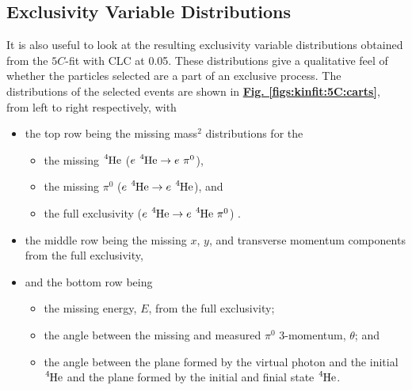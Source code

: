 \documentclass[10pt,prd,aps,showpacs,twocolumn,unsortedaddress]{revtex4-1}
\newcommand\he{{\ce{^{4}He}}}
\newcommand\pio{{\pi^0}}
\renewcommand\b[1]{{\textbf{#1}}}
\renewcommand\u[1]{{\underline{#1}}}
\newcommand\Fig[1]{\b{{\u{{Fig. #1}}}}}
\begin{document}
\subsection{Exclusivity Variable Distributions}
It is also useful to look at the resulting exclusivity variable distributions obtained from the $5C$-fit with CLC at 0.05.  
These distributions give a qualitative feel of whether the particles selected are a part of an exclusive process. 
The distributions of the selected events are shown in \Fig{\ref{figs:kinfit:5C:carts}}, from left to right respectively, with
\begin{itemize}
  \item 
  the top row being the missing mass$^2$ distributions for the 
  \begin{itemize}
    \item the missing $\he$ ($e ~\he \rightarrow e ~\pio$), 
    \item the missing $\pio$ ($e ~\he \rightarrow e ~\he$), and 
    \item the full exclusivity ($e ~\he \rightarrow e ~\he ~\pio$) .
  \end{itemize}
  \item 
  the middle row being the missing $x$, $y$, and transverse momentum components from the full exclusivity,
  \item 
  and the bottom row being 
  \begin{itemize}
    \item the missing energy, $E$, from the full exclusivity; 
    \item the angle between the missing and measured $\pio$ 3-momentum, $\theta$; and 
    \item the angle between the plane formed by the virtual photon and the initial $\he$ and the plane formed by the initial and finial state $\he$.
  \end{itemize}
  \end{itemize}
\end{document}
